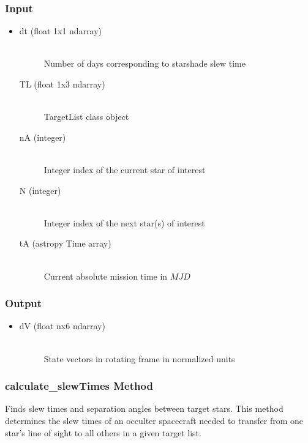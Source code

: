\documentclass[cleanfoot]{asme2ej}
\begin{document}
\subsubsection*{Input}
\begin{itemize}
\item
\begin{description}
    \item[dt (float 1x1 ndarray)] \hfill \\ Number of days corresponding to starshade slew time
    \item[TL (float 1x3 ndarray)] \hfill \\ TargetList class object
    \item[nA (integer)] \hfill \\ Integer index of the current star of interest
    \item[N (integer)] \hfill \\ Integer index of the next star(s) of interest
    \item[tA (astropy Time array)] \hfill \\ Current absolute mission time in $MJD$
\end{description}
\end{itemize}
\subsubsection*{Output}
\begin{itemize}
\item
\begin{description}
    \item[dV (float nx6 ndarray)] \hfill \\ State vectors in rotating frame in normalized units
\end{description}
\end{itemize}

\subsubsection{calculate\_slewTimes Method} 
Finds slew times and separation angles between target stars. This method determines the slew times of an occulter spacecraft needed to transfer from one star's line of sight to all others in a given target list.
\end{document}
